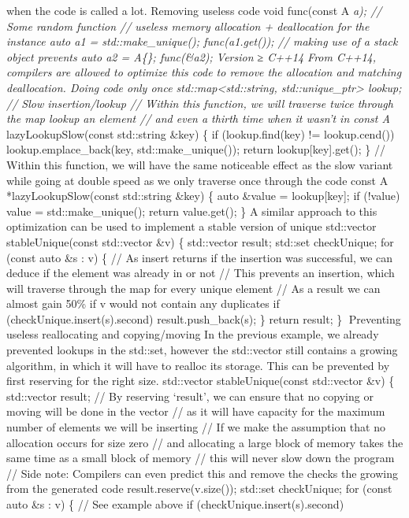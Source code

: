 when the code is called a lot. Removing useless code void func(const A
\emph{a); // Some random function // useless memory allocation +
deallocation for the instance auto a1 = std::make\_unique();
func(a1.get()); // making use of a stack object prevents auto a2 =
A\{\}; func(\&a2); Version ≥ C++14 From C++14, compilers are allowed to
optimize this code to remove the allocation and matching deallocation.
Doing code only once std::map\textless std::string,
std::unique\_ptr\textgreater{} lookup; // Slow insertion/lookup //
Within this function, we will traverse twice through the map lookup an
element // and even a thirth time when it wasn't in const A
}lazyLookupSlow(const std::string \&key) \{ if (lookup.find(key) !=
lookup.cend()) lookup.emplace\_back(key, std::make\_unique()); return
lookup{[}key{]}.get(); \} // Within this function, we will have the same
noticeable effect as the slow variant while going at double speed as we
only traverse once through the code const A *lazyLookupSlow(const
std::string \&key) \{ auto \&value = lookup{[}key{]}; if (!value) value
= std::make\_unique(); return value.get(); \} A similar approach to this
optimization can be used to implement a stable version of unique
std::vector stableUnique(const std::vector \&v) \{ std::vector result;
std::set checkUnique; for (const auto \&s : v) \{ // As insert returns
if the insertion was successful, we can deduce if the element was
already in or not // This prevents an insertion, which will traverse
through the map for every unique element // As a result we can almost
gain 50\% if v would not contain any duplicates if
(checkUnique.insert(s).second) result.push\_back(s); \} return result;
\} Preventing useless reallocating and copying/moving In the previous
example, we already prevented lookups in the std::set, however the
std::vector still contains a growing algorithm, in which it will have to
realloc its storage. This can be prevented by ﬁrst reserving for the
right size. std::vector stableUnique(const std::vector \&v) \{
std::vector result; // By reserving `result', we can ensure that no
copying or moving will be done in the vector // as it will have capacity
for the maximum number of elements we will be inserting // If we make
the assumption that no allocation occurs for size zero // and allocating
a large block of memory takes the same time as a small block of memory
// this will never slow down the program // Side note: Compilers can
even predict this and remove the checks the growing from the generated
code result.reserve(v.size()); std::set checkUnique; for (const auto \&s
: v) \{ // See example above if (checkUnique.insert(s).second)
